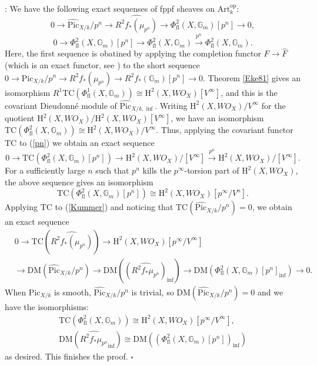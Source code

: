 \documentclass[a4paper,12pt,twoside]{report}
\newcommand{\G}{\mathbb{G}}
\newcommand{\Pic}{\mathrm{Pic}}
\newcommand{\HH}{\mathrm{H}}
\newcommand{\TC}{\mathrm{TC}}
\newcommand{\DM}{\mathrm{DM}}
\newcommand{\art}{\mathrm{Art}}
\newcommand{\op}{\mathrm{op}}
\newcommand{\fl}{\mathrm{fl}}
\begin{document}
: %
We have the following exact sequenses of fppf sheaves on $\art_k^{\op}$: 
\begin{equation}\label{Kummer}
    0\rightarrow \widehat{\Pic}_{X/k}/p^n \rightarrow \widehat{R^2f_*(\mu_{p^n})} \rightarrow \Phi^2_{\fl}(X,\G_m)[p^n] \rightarrow 0,
\end{equation}
\begin{equation}\label{pn}
    0\rightarrow \Phi^2_{\fl}(X,\G_m)[p^n] \rightarrow \Phi^2_{\fl}(X,\G_m) \xrightarrow{p^n} \Phi^2_{\fl}(X,\G_m).
\end{equation}
Here, the first sequence is obatined by applying the completion functor 
$F\rightarrow \widehat{F}$ (which is an exact functor, see \cite[Lemma 10.4]{BO}) to the short sequence $0\rightarrow \Pic_{X/k}/p^n\rightarrow  R^2f_*(\mu_{p^n})\rightarrow R^2f_*(\G_m)[p^n]\rightarrow 0$. 
Theorem \ref{Eke81} gives an isomorphism
$R^1\TC(\Phi^1_{\fl}(X,\G_m))\cong\HH^2(X,WO_{X})[V^\infty]$, and this 
is the covariant Dieudonné module of $\widehat{\Pic}_{X/k,\inf}$.
Writing $\HH^2(X,WO_{X})/V^\infty$ for the quotient
$\HH^2(X,WO_{X})/\HH^2(X,WO_{X})[V^{\infty}]$, we have an isomorphism
$\TC(\Phi^2_{\fl}(X,\G_m))\cong\HH^2(X,WO_{X})/V^\infty$.
Thus, applying the covariant functor $\TC$ to (\ref{pn}) we obtain an exact sequence
\[
    0\rightarrow \TC(\Phi^2_{\fl}(X,\G_m)[p^n]) \rightarrow \HH^2(X,WO_{X})/[V^{\infty}] \xrightarrow{p^n} \HH^2(X,WO_{X})/[V^{\infty}].
\]
For a sufficiently large $n$ such that $p^n$ kills the $p^{\infty}$-torsion part of $\HH^2(X,WO_{X})$, 
the above sequence gives an isomorphism
\[ 
    \TC(\Phi^2_{\fl}(X,\G_m)[p^n])\cong \HH^2(X,WO_{X})[p^{\infty}/V^n].
\]
Applying $\TC$ to (\ref{Kummer}) and noticing that $\TC(\widehat{\Pic}_{X/k}/p^n)=0$, we obtain an exact sequence
\begin{equation}
    \begin{aligned}
    &0 \rightarrow \TC(\widehat{R^2f_*(\mu_{p^n})}) \rightarrow \HH^2(X,WO_{X})[p^{\infty}/V^\infty]\\
    & \rightarrow \DM(\widehat{\Pic}_{X/k}/p^n) \rightarrow \DM((\widehat{R^2f_*\mu_{p^n}})_{\inf}) \rightarrow \DM(\Phi^2_{\fl}(X,\G_m)[p^n]_{\inf}) \rightarrow 0.
    \end{aligned}
\end{equation}
When $\Pic_{X/k}$ is smooth, $\widehat{\Pic}_{X/k}/p^n$ is trivial, so $\DM(\widehat{\Pic}_{X/k}/p^n)=0$ 
and we have the isomorphisms: 
\[\begin{aligned}
    \TC(\Phi^2_{\fl}(X,\G_m)) \cong \HH^2(X,WO_{X})[p^{\infty}/V^\infty],\\
\DM(\widehat{R^2f_*\mu_{p^n}}_{\inf}) \cong \DM((\Phi^2_{\fl}(X,\G_m)[p^n])_{\inf})
\end{aligned} \] as desired. 
This finishes the proof. $\square$
\end{document}
